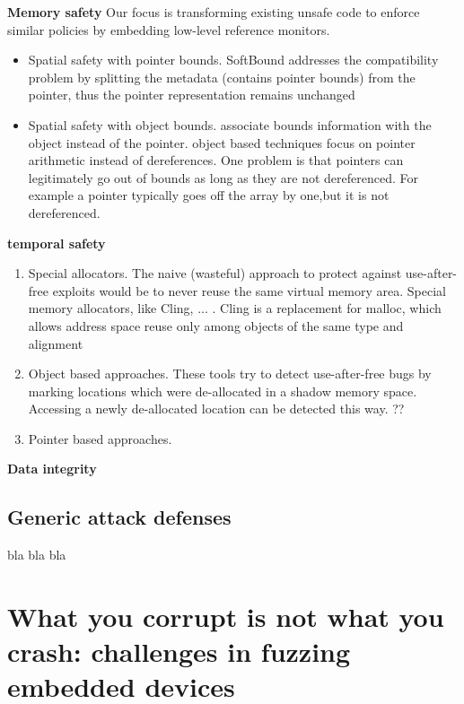 \documentclass{article}
\begin{document}
\textbf{Memory safety}
Our focus is transforming existing unsafe code to enforce similar policies by embedding low-level reference monitors.
\begin{itemize}
\item Spatial safety with pointer bounds. SoftBound addresses the compatibility problem by splitting the metadata (contains pointer bounds) from the pointer, thus the pointer
representation remains unchanged
\item Spatial safety with object bounds. associate bounds information with the object instead of the pointer. object based techniques focus on pointer arithmetic instead of dereferences. One problem is that pointers
can legitimately go out of bounds as long as they are not dereferenced. For example a pointer typically goes off the array by one,but it is not dereferenced.
\end{itemize}
\textbf{temporal safety}
\begin{enumerate}
\item Special allocators. The naive (wasteful) approach to protect against use-after-free exploits would be to never reuse the same virtual memory area. Special memory allocators, like Cling, ... . Cling is a replacement for malloc, which allows address space reuse only among objects of the same type and alignment
\item Object based approaches. These tools
try to detect use-after-free bugs by marking locations which
were de-allocated in a shadow memory space. Accessing
a newly de-allocated location can be detected this way. ?? 
\item Pointer based approaches. 
\end{enumerate}
\textbf{Data integrity}

\subsection{Generic attack defenses}
bla bla bla 

\section{What you corrupt is not what you crash: challenges in fuzzing embedded devices}
\end{document}
